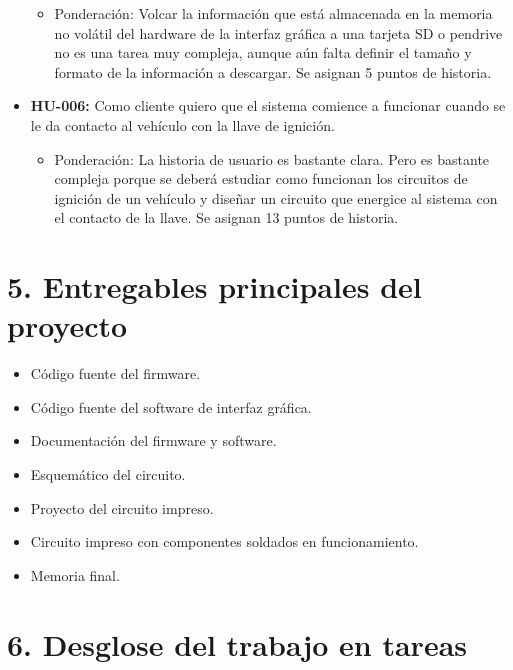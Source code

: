 \documentclass[11pt]{charter}
\begin{document}
\begin{itemize}
	\begin{itemize}
	\item Ponderación: Volcar la información que está almacenada en la memoria no volátil del hardware de la interfaz gráfica a una tarjeta SD o pendrive no es una tarea muy compleja, aunque aún falta definir el tamaño y formato de la información a descargar. Se asignan 5 puntos de historia.
	\end{itemize}
\item \textbf{HU-006:} Como cliente quiero que el sistema comience a funcionar cuando se le da contacto al vehículo con la llave de ignición.
	\begin{itemize}
	\item Ponderación: La historia de usuario es bastante clara. Pero es bastante compleja porque se deberá estudiar como funcionan los circuitos de ignición de un vehículo y diseñar un circuito que energice al sistema con el contacto de la llave. Se asignan 13 puntos de historia.
	\end{itemize}
\end{itemize}

\section{5. Entregables principales del proyecto}
\label{sec:entregables}

\begin{itemize}
\item Código fuente del firmware.
\item Código fuente del software de interfaz gráfica.
\item Documentación del firmware y software.
\item Esquemático del circuito.
\item Proyecto del circuito impreso.
\item Circuito impreso con componentes soldados en funcionamiento.
\item Memoria final.
\end{itemize}

\section{6. Desglose del trabajo en tareas}
\label{sec:wbs}
\end{document}
